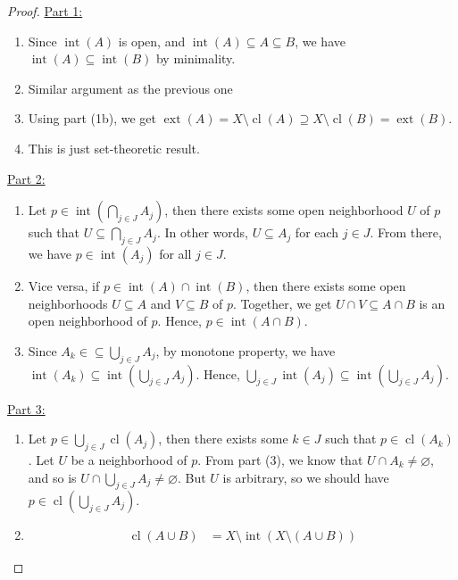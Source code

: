 \documentclass{treatise}
\begin{document}
\begin{proof}
\underline{Part 1:}
\begin{enumerate}[label=(\alph*)]
    \item Since $\operatorname{int}(A)$ is open, and $\operatorname{int}(A) \subseteq A \subseteq B$, we have $\operatorname{int}(A) \subseteq \operatorname{int}(B)$ by minimality.
    \item Similar argument as the previous one
    \item Using part (1b), we get $\operatorname{ext}(A) = X \setminus \operatorname{cl}(A) \supseteq X \setminus \operatorname{cl}(B) = \operatorname{ext}(B)$.
    \item This is just set-theoretic result.
\end{enumerate}
\underline{Part 2:}
\begin{enumerate}[label=(\alph*)]
    \item Let $p \in \operatorname{int}(\bigcap_{j \in J} A_j)$, then there exists some open neighborhood $U$ of $p$ such that $U \subseteq \bigcap_{j \in J} A_j$. In other words, $U \subseteq A_j$ for each $j \in J$. From there, we have $p \in \operatorname{int}(A_j)$ for all $j \in J$.
    \item Vice versa, if $p \in \operatorname{int}(A) \cap \operatorname{int}(B)$, then there exists some open neighborhoods $U \subseteq A$ and $V \subseteq B$ of $p$. Together, we get $U \cap V \subseteq A \cap B$ is an open neighborhood of $p$. Hence, $p \in \operatorname{int}(A \cap B)$.
    \item Since $A_k \in \subseteq \bigcup_{j \in J} A_j$, by monotone property, we have $\operatorname{int}(A_k) \subseteq \operatorname{int} \left( \bigcup_{j \in J} A_j \right)$. Hence, $\bigcup_{j \in J} \operatorname{int}(A_j) \subseteq \operatorname{int} \left( \bigcup_{j \in J} A_j \right)$.
\end{enumerate}
\underline{Part 3:}
\begin{enumerate}[label=(\alph*)]
    \item Let $p \in \bigcup_{j \in J} \operatorname{cl}(A_j)$, then there exists some $k \in J$ such that $p \in \operatorname{cl}(A_k)$. Let $U$ be a neighborhood of $p$. From part (3), we know that $U \cap A_k \neq \varnothing$, and so is $U \cap \bigcup_{j \in J} A_j \neq \varnothing$. But $U$ is arbitrary, so we should have $p \in \operatorname{cl} \left( \bigcup_{j \in J} A_j \right)$.
    \item
    \begin{align*}
        \operatorname{cl}(A \cup B) & = X \setminus \operatorname{int}(X \setminus (A \cup B))

\end{align*}
\end{enumerate}
\end{proof}
\end{document}
